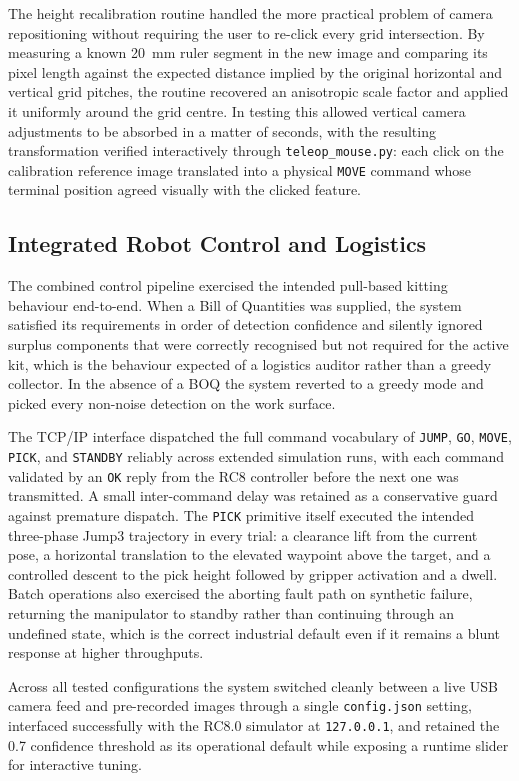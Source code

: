 \documentclass[conference]{IEEEtran}
\begin{document}
The height recalibration routine handled the more practical problem of camera repositioning without requiring the user to re-click every grid intersection. By measuring a known 20~mm ruler segment in the new image and comparing its pixel length against the expected distance implied by the original horizontal and vertical grid pitches, the routine recovered an anisotropic scale factor and applied it uniformly around the grid centre. In testing this allowed vertical camera adjustments to be absorbed in a matter of seconds, with the resulting transformation verified interactively through \texttt{teleop\_mouse.py}: each click on the calibration reference image translated into a physical \texttt{MOVE} command whose terminal position agreed visually with the clicked feature.

\subsection{Integrated Robot Control and Logistics}
The combined control pipeline exercised the intended pull-based kitting behaviour end-to-end. When a Bill of Quantities was supplied, the system satisfied its requirements in order of detection confidence and silently ignored surplus components that were correctly recognised but not required for the active kit, which is the behaviour expected of a logistics auditor rather than a greedy collector. In the absence of a BOQ the system reverted to a greedy mode and picked every non-noise detection on the work surface.

The TCP/IP interface dispatched the full command vocabulary of \texttt{JUMP}, \texttt{GO}, \texttt{MOVE}, \texttt{PICK}, and \texttt{STANDBY} reliably across extended simulation runs, with each command validated by an \texttt{OK} reply from the RC8 controller before the next one was transmitted. A small inter-command delay was retained as a conservative guard against premature dispatch. The \texttt{PICK} primitive itself executed the intended three-phase Jump3 trajectory in every trial: a clearance lift from the current pose, a horizontal translation to the elevated waypoint above the target, and a controlled descent to the pick height followed by gripper activation and a dwell. Batch operations also exercised the aborting fault path on synthetic failure, returning the manipulator to standby rather than continuing through an undefined state, which is the correct industrial default even if it remains a blunt response at higher throughputs.

Across all tested configurations the system switched cleanly between a live USB camera feed and pre-recorded images through a single \texttt{config.json} setting, interfaced successfully with the RC8.0 simulator at \texttt{127.0.0.1}, and retained the 0.7 confidence threshold as its operational default while exposing a runtime slider for interactive tuning.
\end{document}
